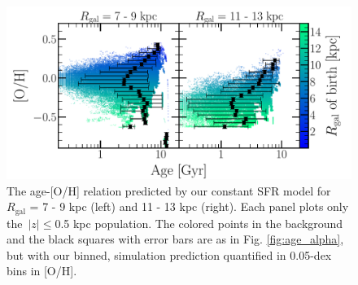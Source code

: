 \documentclass[fleqn, usenatbib]{mnras}
\begin{document}
\begin{figure} 
\centering 
\includegraphics[scale = 0.35]{amr_static_o.pdf} 
\caption{The age-[O/H] relation predicted by our constant SFR model for 
$R_\text{gal}$ = 7 - 9 kpc (left) and 11 - 13 kpc (right). Each panel plots 
only the~$\left|z\right|\leq$0.5 kpc population. The colored points in the 
background and the black squares with error bars are as in Fig. 
\ref{fig:age_alpha}, but with our binned, simulation prediction quantified in 
0.05-dex bins in [O/H]. } 
\label{fig:age_oh_static} 
\end{figure} 
\end{document}
